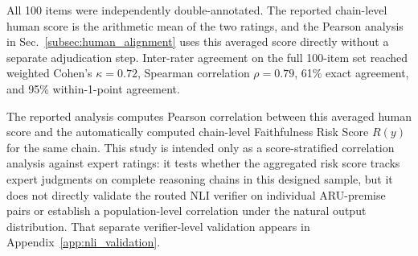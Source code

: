 \documentclass[a4paper,fleqn,doubleblind]{cas-sc}
\begin{document}
All 100 items were independently double-annotated. The reported chain-level human score is the arithmetic mean of the two ratings, and the Pearson analysis in Sec.~\ref{subsec:human_alignment} uses this averaged score directly without a separate adjudication step. Inter-rater agreement on the full 100-item set reached weighted Cohen's $\kappa=0.72$, Spearman correlation $\rho=0.79$, 61\% exact agreement, and 95\% within-1-point agreement.

The reported analysis computes Pearson correlation between this averaged human score and the automatically computed chain-level Faithfulness Risk Score $R(y)$ for the same chain. This study is intended only as a score-stratified correlation analysis against expert ratings: it tests whether the aggregated risk score tracks expert judgments on complete reasoning chains in this designed sample, but it does not directly validate the routed NLI verifier on individual ARU-premise pairs or establish a population-level correlation under the natural output distribution. That separate verifier-level validation appears in Appendix~\ref{app:nli_validation}.
\end{document}
